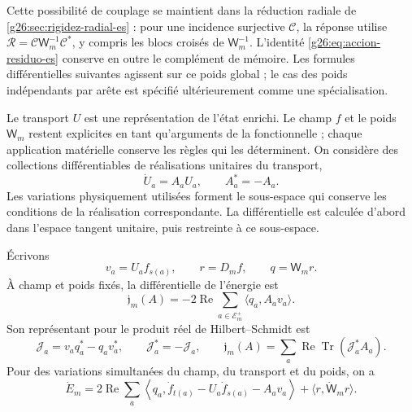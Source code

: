 Cette possibilité de couplage se maintient dans la réduction radiale de
\ref{g26:sec:rigidez-radial-es} : pour une incidence surjective
\(\mathcal C\), la réponse utilise
\(\mathcal R=\mathcal C\mathsf W_m^{-1}\mathcal C^*\), y compris
les blocs croisés de \(\mathsf W_m^{-1}\). L'identité
\eqref{g26:eq:accion-residuo-es} conserve en outre le complément de
mémoire. Les formules différentielles suivantes agissent sur ce poids
global ; le cas des poids indépendants par arête est spécifié
ultérieurement comme une spécialisation.

Le transport \(U\) est une représentation de l'état enrichi. Le champ \(f\) et le poids \(\mathsf W_m\) restent explicites en tant qu'arguments de la fonctionnelle ; chaque application matérielle conserve les règles qui les déterminent. On considère des collections différentiables de réalisations unitaires du transport,
\[
 \dot U_a=A_aU_a,\qquad A_a^*=-A_a.
\]
Les variations physiquement utilisées forment le sous-espace qui conserve
les conditions de la réalisation correspondante. La différentielle est
calculée d'abord dans l'espace tangent unitaire, puis restreinte
à ce sous-espace.

\begin{proposition}
\label{vii:prop:covector-memoria}
Écrivons
\[
 v_a=U_af_{s(a)},\qquad r=D_mf,\qquad q=\mathsf W_mr.
\]
À champ et poids fixés, la différentielle de l'énergie est
\begin{equation}
 \mathfrak j_m(A)=-2\operatorname{Re}
       \sum_{a\in\mathcal E_m^+}\langle q_a,A_av_a\rangle .
 \label{vii:eq:covector-memoria}
\end{equation}
Son représentant pour le produit réel de Hilbert--Schmidt est
\begin{equation}
 \mathcal J_a=v_aq_a^*-q_av_a^*,\qquad
 \mathcal J_a^*=-\mathcal J_a,\qquad
 \mathfrak j_m(A)=
 \sum_a\operatorname{Re}\operatorname{Tr}(\mathcal J_a^*A_a).
 \label{vii:eq:representante-corriente-discreta}
\end{equation}
Pour des variations simultanées du champ, du transport et du poids, on a
\begin{equation}
 \dot E_m=
 2\operatorname{Re}\sum_a
 \left\langle q_a,\dot f_{t(a)}-U_a\dot f_{s(a)}-A_av_a\right\rangle
 +\langle r,\dot{\mathsf W}_mr\rangle .
 \label{vii:eq:variacion-completa-memoria}
\end{equation}
\end{proposition}

